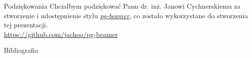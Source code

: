 \documentclass[polish]{beamer}
\begin{document}
\begin{frame}{Podziękowania}
    Chciałbym podziękować Panu dr. inż. Janowi Cychnerskiemu za stworzenie 
    i udostępnienie stylu \href{https://github.com/jachoo/pg-beamer}{\emph{pg-beamer}}, 
    co zostało wykorzystane do stworzenia tej prezentacji.\\
    \url{https://github.com/jachoo/pg-beamer}
     
\end{frame}

\begin{frame}[allowframebreaks]{Bibliografia}
    
    
\end{frame}

\pglastframe


\end{document}
